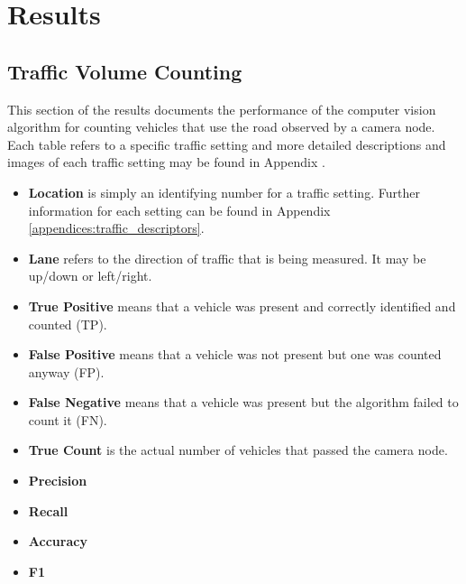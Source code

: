 \chapter{Results}

\section{Traffic Volume Counting}

This section of the results documents the performance of the computer vision algorithm for counting vehicles that use the road observed by a camera node. Each table refers to a specific traffic setting and more detailed descriptions and images of each traffic setting may be found in Appendix . 

\begin{itemize}
\item\textbf{Location} is simply an identifying number for a traffic setting. Further information for each setting can be found in Appendix \ref{appendices:traffic_descriptors}.
\item\textbf{Lane} refers to the direction of traffic that is being measured. It may be up/down or left/right.
\item\textbf{True Positive} means that a vehicle was present and correctly identified and counted (TP).
\item\textbf{False Positive} means that a vehicle was not present but one was counted anyway (FP).
\item\textbf{False Negative} means that a vehicle was present but the algorithm failed to count it (FN).
\item\textbf{True Count} is the actual number of vehicles that passed the camera node. 
\item\textbf{Precision}
\item\textbf{Recall}
\item\textbf{Accuracy}
\item\textbf{F1}
\end{itemize}



